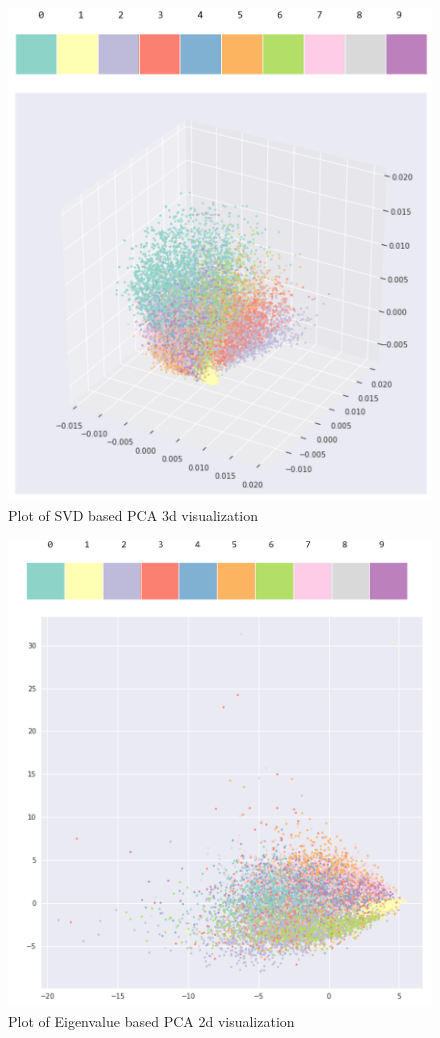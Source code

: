 \documentclass[11pt, oneside]{article}
\begin{document}
\begin{figure}[h]
\centering
\includegraphics{./pics/svd_pca_3d.PNG}
\caption{Plot of SVD based PCA 3d visualization}
\end{figure}

\begin{figure}[h]
\centering
\includegraphics{./pics/cov_pca_2d.PNG}
\caption{Plot of Eigenvalue based PCA 2d visualization}
\end{figure}
\end{document}
